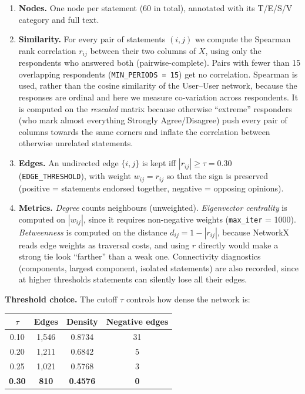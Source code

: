 \documentclass[11pt]{article}
\begin{document}
\begin{enumerate}[nosep, leftmargin=1.5em]
    \item \textbf{Nodes.} One node per statement (60 in total), annotated with its T/E/S/V
    category and full text.
    \item \textbf{Similarity.} For every pair of statements $(i,j)$ we compute the Spearman
    rank correlation $r_{ij}$ between their two columns of $X$, using only the respondents who
    answered both (pairwise-complete). Pairs with fewer than 15 overlapping respondents
    (\texttt{MIN\_PERIODS = 15}) get no correlation. Spearman is used, rather than the cosine
    similarity of the User--User network, because the responses are ordinal and here we measure
    co-variation across respondents. It is computed on the \emph{rescaled} matrix because
    otherwise ``extreme'' responders (who mark almost everything Strongly Agree/Disagree) push
    every pair of columns towards the same corners and inflate the correlation between
    otherwise unrelated statements.
    \item \textbf{Edges.} An undirected edge $\{i,j\}$ is kept iff $|r_{ij}| \geq \tau = 0.30$
    (\texttt{EDGE\_THRESHOLD}), with weight $w_{ij} = r_{ij}$ so that the sign is preserved
    (positive = statements endorsed together, negative = opposing opinions).
    \item \textbf{Metrics.} \emph{Degree} counts neighbours (unweighted).
    \emph{Eigenvector centrality} is computed on $|w_{ij}|$, since it requires non-negative
    weights (\texttt{max\_iter} = 1000). \emph{Betweenness} is computed on the distance
    $d_{ij} = 1 - |r_{ij}|$, because NetworkX reads edge weights as traversal costs, and using
    $r$ directly would make a strong tie look ``farther'' than a weak one. Connectivity
    diagnostics (components, largest component, isolated statements) are also recorded, since
    at higher thresholds statements can silently lose all their edges.
\end{enumerate}

\textbf{Threshold choice.} The cutoff $\tau$ controls how dense the network is:

\begin{center}
\small
\begin{tabular}{cccc}
\toprule
$\tau$ & \textbf{Edges} & \textbf{Density} & \textbf{Negative edges} \\
\midrule
0.10 & 1{,}546 & 0.8734 & 31 \\
0.20 & 1{,}211 & 0.6842 & 5 \\
0.25 & 1{,}021 & 0.5768 & 3 \\
\textbf{0.30} & \textbf{810} & \textbf{0.4576} & \textbf{0} \\
\bottomrule
\end{tabular}
\end{center}
\end{document}
